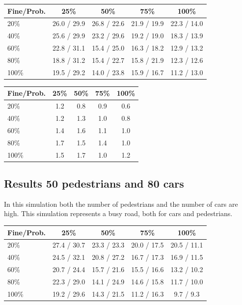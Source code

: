 \documentclass[a4paper]{article}
\begin{document}
\begin{table}[H]
\centering
\begin{tabular}{ l | c c c c }
  Fine\slash Prob. & 25\% & 50\% & 75\% & 100\% \\ 
  \hline
  20\%  & 26.0 / 29.9 & 26.8 / 22.6 & 21.9 / 19.9 & 22.3 / 14.0  \\
  40\%  & 25.6 / 29.9 & 23.2 / 29.6 & 19.2 / 19.0 & 18.3 / 13.9  \\
  60\%  & 22.8 / 31.1 & 15.4 / 25.0 & 16.3 / 18.2 & 12.9 / 13.2  \\
  80\%  & 18.8 / 31.2 & 15.4 / 22.7 & 15.8 / 21.9 & 12.3 / 12.6  \\
  100\% & 19.5 / 29.2 & 14.0 / 23.8 & 15.9 / 16.7 & 11.2 / 13.0  \\
\end{tabular}
\end{table}

\begin{table}[H]
\centering
\begin{tabular}{ l | c c c c }
  Fine\slash Prob. & 25\% & 50\% & 75\% & 100\% \\ 
  \hline
  20\%  & 1.2 & 0.8 & 0.9 & 0.6  \\
  40\%  & 1.2 & 1.3 & 1.0 & 0.8  \\
  60\%  & 1.4 & 1.6 & 1.1 & 1.0  \\
  80\%  & 1.7 & 1.5 & 1.4 & 1.0  \\
  100\% & 1.5 & 1.7 & 1.0 & 1.2  \\
\end{tabular}
\end{table}

\subsection{Results 50 pedestrians and 80 cars}
In this simulation both the number of pedestrians and the number of cars are high. This simulation represents a busy road, both for cars and pedestrians.

\begin{table}[H]
\centering
\begin{tabular}{ l | c c c c }
  Fine\slash Prob. & 25\% & 50\% & 75\% & 100\% \\ 
  \hline
  20\%  & 27.4 / 30.7 & 23.3 / 23.3 & 20.0 / 17.5 & 20.5 / 11.1  \\
  40\%  & 24.5 / 32.1 & 20.8 / 27.2 & 16.7 / 17.3 & 16.9 / 11.5  \\
  60\%  & 20.7 / 24.4 & 15.7 / 21.6 & 15.5 / 16.6 & 13.2 / 10.2  \\
  80\%  & 22.3 / 29.0 & 14.1 / 24.9 & 14.6 / 15.8 & 11.7 / 10.0  \\
  100\% & 19.2 / 29.6 & 14.3 / 21.5 & 11.2 / 16.3 &  9.7 /  9.3  \\
\end{tabular}
\end{table}
\end{document}
